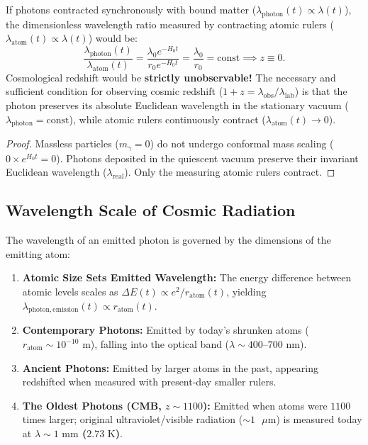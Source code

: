 \begin{theorem}
    \label{thm:kirmiziya_kayma_varlik_sarti}
    If photons contracted synchronously with bound matter ($\lambda_{\mathrm{photon}}(t) \propto \lambda(t)$), the dimensionless wavelength ratio measured by contracting atomic rulers ($\lambda_{\mathrm{atom}}(t) \propto \lambda(t)$) would be:
    \begin{equation}
        \frac{\lambda_{\mathrm{photon}}(t)}{\lambda_{\mathrm{atom}}(t)} = \frac{\lambda_0 e^{-H_0 t}}{r_0 e^{-H_0 t}} = \frac{\lambda_0}{r_0} = \text{const} \implies z \equiv 0.
    \end{equation}
    Cosmological redshift would be \textbf{strictly unobservable!} The necessary and sufficient condition for observing cosmic redshift ($1+z = \lambda_{\mathrm{obs}}/\lambda_{\mathrm{lab}}$) is that the photon preserves its absolute Euclidean wavelength in the stationary vacuum ($\lambda_{\mathrm{photon}} = \text{const}$), while atomic rulers continuously contract ($\lambda_{\mathrm{atom}}(t) \to 0$).
\end{theorem}

\begin{proof}
    Massless particles ($m_\gamma = 0$) do not undergo conformal mass scaling ($0 \times e^{H_0 t} = 0$). Photons deposited in the quiescent vacuum preserve their invariant Euclidean wavelength ($\lambda_{\text{real}}$). Only the measuring atomic rulers contract.
\end{proof}

\subsection{Wavelength Scale of Cosmic Radiation}
\label{sec:fotonlar_neden_devasa_degil}

The wavelength of an emitted photon is governed by the dimensions of the emitting atom:
\begin{enumerate}
    \item \textbf{Atomic Size Sets Emitted Wavelength:} The energy difference between atomic levels scales as $\Delta E(t) \propto e^2 / r_{\mathrm{atom}}(t)$, yielding $\lambda_{\mathrm{photon, emission}}(t) \propto r_{\mathrm{atom}}(t)$.
    \item \textbf{Contemporary Photons:} Emitted by today's shrunken atoms ($r_{\mathrm{atom}} \sim 10^{-10}\text{ m}$), falling into the optical band ($\lambda \sim 400\text{--}700\text{ nm}$).
    \item \textbf{Ancient Photons:} Emitted by larger atoms in the past, appearing redshifted when measured with present-day smaller rulers.
    \item \textbf{The Oldest Photons (CMB, $z \sim 1100$):} Emitted when atoms were $1100$ times larger; original ultraviolet/visible radiation ($\sim 1\text{ }\mu\mathrm{m}$) is measured today at \textbf{$\lambda \sim 1\text{ mm}$ ($2.73\text{ K}$)}.
\end{enumerate}
